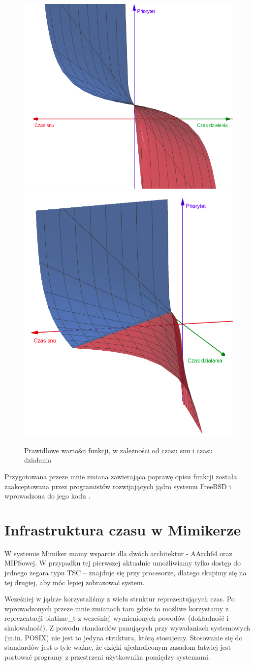 \documentclass[shortabstract]{iithesis}
\theoremstyle{definition} \newtheorem*{definition}{Definicja}
\theoremstyle{definition} \newtheorem*{example}{Przykład}
\theoremstyle{definition} \newtheorem*{remark}{Uwaga}
\begin{document}
\begin{figure}[H]
\centering
  \centering
  \includegraphics[width=.5\linewidth]{images/sigmoid1.png}
  \label{fig:sig1}
  \centering
  \includegraphics[width=.45 \linewidth]{images/sigmoid2.png}
  \label{fig:sig2}
\caption{Prawidłowe wartości funkcji, w zależności od czasu snu i czasu działania}
\label{fig:sig22}
\end{figure}

Przygotowana przeze mnie zmiana zawierająca poprawę opisu funkcji została zaakceptowana przez programistów rozwijających jądro systemu FreeBSD i wprowadzona do jego kodu \cite{bib:ulepr}.

\chapter{Infrastruktura czasu w Mimikerze}
W systemie Mimiker mamy wsparcie dla dwóch architektur - AArch64 oraz MIPSowej. W przypadku tej pierwszej aktualnie umożliwiamy tylko dostęp do jednego zegara typu TSC -- znajduje się przy procesorze, dlatego skupimy się na tej drugiej, aby móc lepiej zobrazować system.

Wcześniej w jądrze korzystaliśmy z wielu struktur reprezentujących czas. Po wprowadzonych przeze mnie zmianach tam gdzie to możliwe korzystamy z reprezentacji bintime\_t z wcześniej wymienionych powodów (dokładność i skalowalność). Z powodu standardów panujących przy wywołaniach systemowych (m.in. POSIX) nie jest to jedyna struktura, którą stosujemy. Stosowanie się do standardów jest o tyle ważne, że dzięki ujednoliconym zasadom łatwiej jest portować programy z przestrzeni użytkownika pomiędzy systemami.
\end{document}
